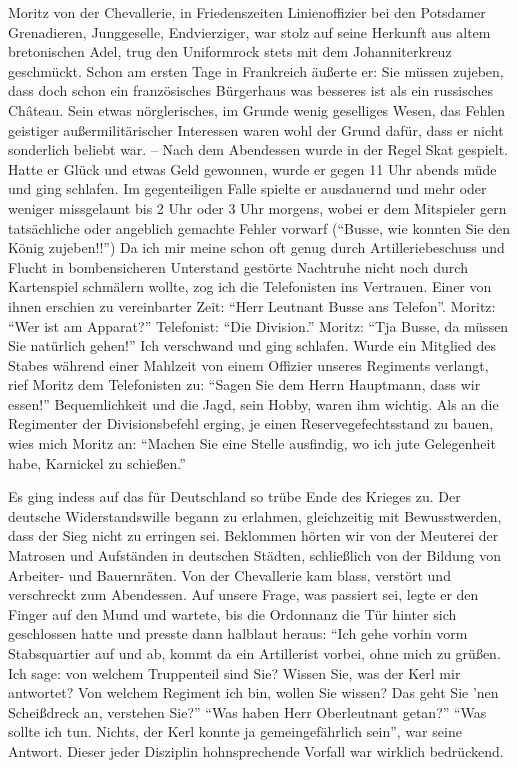 \documentclass[a5paper,pagesize,10pt,twoside=true]{scrbook}
\begin{document}
Moritz von der Chevallerie, in Friedenszeiten Linienoffizier bei den Potsdamer Grenadieren, Junggeselle, Endvierziger, war stolz auf seine Herkunft aus altem bretonischen Adel, trug den Uniformrock stets mit dem Johanniterkreuz geschmückt. Schon am ersten Tage in Frankreich äußerte er: Sie müssen zujeben, dass doch schon ein französisches Bürgerhaus was besseres ist als ein russisches Château. Sein etwas nörglerisches, im Grunde wenig geselliges Wesen, das Fehlen geistiger außermilitärischer Interessen waren wohl der Grund dafür, dass er nicht sonderlich beliebt war. -- Nach dem Abendessen wurde in der Regel Skat gespielt. Hatte er Glück und etwas Geld gewonnen, wurde er gegen 11 Uhr abends müde und ging schlafen. Im gegenteiligen Falle spielte er ausdauernd und mehr oder weniger missgelaunt bis 2 Uhr oder 3 Uhr morgens, wobei er dem Mitspieler gern tatsächliche oder angeblich gemachte Fehler vorwarf (\enquote{Busse, wie konnten Sie den König zujeben!!}) Da ich mir meine schon oft genug durch Artilleriebeschuss und Flucht in bombensicheren Unterstand gestörte Nachtruhe nicht noch durch Kartenspiel schmälern wollte, zog ich die Telefonisten ins Vertrauen. Einer von ihnen erschien zu vereinbarter Zeit: \enquote{Herr Leutnant Busse ans Telefon}. Moritz: \enquote{Wer ist am Apparat?} Telefonist: \enquote{Die Division.} Moritz: \enquote{Tja Busse, da müssen Sie natürlich gehen!} Ich verschwand und ging schlafen. Wurde ein Mitglied des Stabes während einer Mahlzeit von einem Offizier unseres Regiments verlangt, rief Moritz dem Telefonisten zu: \enquote{Sagen Sie dem Herrn Hauptmann, dass wir essen!} Bequemlichkeit und die Jagd, sein Hobby, waren ihm wichtig. Als an die Regimenter der Divisionsbefehl erging, je einen Reservegefechtsstand zu bauen, wies mich Moritz an: \enquote{Machen Sie eine Stelle ausfindig, wo ich jute Gelegenheit habe, Karnickel zu schießen.}

Es ging indess auf das für Deutschland so trübe Ende des Krieges zu. Der deutsche Widerstandswille begann zu erlahmen, gleichzeitig mit Bewusstwerden, dass der Sieg nicht zu erringen sei. Beklommen hörten wir von der Meuterei der Matrosen und Aufständen in deutschen Städten, schließlich von der Bildung von Arbeiter- und Bauernräten. Von der Chevallerie kam blass, verstört und verschreckt zum Abendessen. Auf unsere Frage, was passiert sei, legte er den Finger auf den Mund und wartete, bis die Ordonnanz die Tür hinter sich geschlossen hatte und presste dann halblaut heraus: \enquote{Ich gehe vorhin vorm Stabsquartier auf und ab, kommt da ein Artillerist vorbei, ohne mich zu grüßen. Ich sage: von welchem Truppenteil sind Sie? Wissen Sie, was der Kerl mir antwortet? Von welchem Regiment ich bin, wollen Sie wissen? Das geht Sie 'nen Scheißdreck an, verstehen Sie?} \enquote{Was haben Herr Oberleutnant getan?} \enquote{Was sollte ich tun. Nichts, der Kerl konnte ja gemeingefährlich sein}, war seine Antwort. Dieser jeder Disziplin hohnsprechende Vorfall war wirklich bedrückend.
\end{document}
